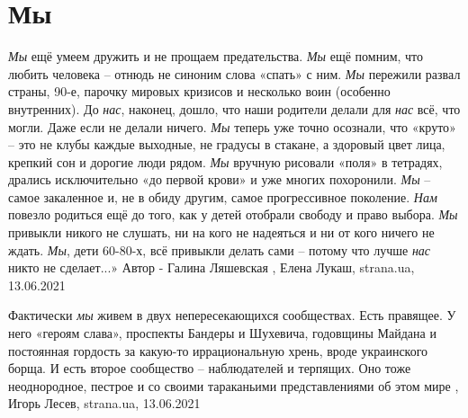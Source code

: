 
 
 
 
 
\chapter{Мы}
\label{sec:slova.my}

\emph{Мы} ещё умеем дружить и не прощаем предательства. \emph{Мы} ещё помним,
что любить человека – отнюдь не синоним слова «спать» с ним. \emph{Мы}
пережили развал страны, 90-е, парочку мировых кризисов и несколько воин
(особенно внутренних).  До \emph{нас}, наконец, дошло, что наши родители делали
для \emph{нас} всё, что могли. Даже если не делали ничего.  \emph{Мы} теперь
уже точно осознали, что «круто» – это не клубы каждые выходные, не градусы в
стакане, а здоровый цвет лица, крепкий сон и дорогие люди рядом.  \emph{Мы}
вручную рисовали «поля» в тетрадях, дрались исключительно «до первой крови» и
уже многих похоронили. \emph{Мы} – самое закаленное и, не в обиду другим, самое
прогрессивное поколение. \emph{Нам} повезло родиться ещё до того, как у детей
отобрали свободу и право выбора. \emph{Мы} привыкли никого не слушать, ни на
кого не надеяться и ни от кого ничего не ждать.  \emph{Мы}, дети 60-80-х, всё
привыкли делать сами – потому что лучше \emph{нас} никто не сделает...» Автор -
Галина Ляшевская
, 
Елена Лукаш, strana.ua, 13.06.2021

Фактически \emph{мы} живем в двух непересекающихся сообществах. Есть правящее. У него
«героям слава», проспекты Бандеры и Шухевича, годовщины Майдана и постоянная
гордость за какую-то иррациональную хрень, вроде украинского борща. И есть
второе сообщество – наблюдателей и терпящих. Оно тоже неоднородное, пестрое и
со своими тараканьими представлениями об этом мире
, 
Игорь Лесев, strana.ua, 13.06.2021

